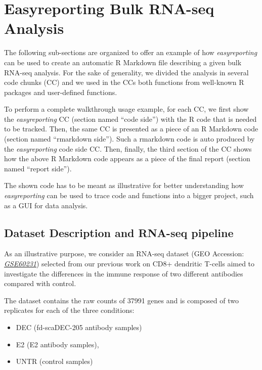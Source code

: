 \documentclass[]{article}
\begin{document}
\hypertarget{easyreporting-bulk-rna-seq-analysis}{%
\section{Easyreporting Bulk RNA-seq
Analysis}\label{easyreporting-bulk-rna-seq-analysis}}

The following sub-sections are organized to offer an example of how
\emph{easyreporting} can be used to create an automatic R Markdown file
describing a given bulk RNA-seq analysis. For the sake of generality, we
divided the analysis in several code chunks (CC) and we used in the CCs
both functions from well-known R packages and user-defined functions.

To perform a complete walkthrough usage example, for each CC, we first
show the \emph{easyreporting} CC (section named ``code side'') with the
R code that is needed to be tracked. Then, the same CC is presented as a
piece of an R Markdown code (section named ``rmarkdown side''). Such a
rmarkdown code is auto produced by the \emph{easyreporting} code side
CC. Then, finally, the third section of the CC shows how the above R
Markdown code appears as a piece of the final report (section named
``report side'').

The shown code has to be meant as illustrative for better understanding
how \emph{easyreporting} can be used to trace code and functions into a
bigger project, such as a GUI for data analysis.

\hypertarget{dataset-description-and-rna-seq-pipeline}{%
\subsection{Dataset Description and RNA-seq
pipeline}\label{dataset-description-and-rna-seq-pipeline}}

As an illustrative purpose, we consider an RNA-seq dataset (GEO
Accession:
\href{https://www.ncbi.nlm.nih.gov/geo/query/acc.cgi?acc=GSE60231}{\emph{GSE60231}})
selected from our previous work on CD8+ dendritic T-cells aimed to
investigate the differences in the immune response of two different
antibodies compared with control.

The dataset contains the raw counts of 37991 genes and is composed of
two replicates for each of the three conditions:

\begin{itemize}
\item
  DEC (fd-scaDEC-205 antibody samples)
\item
  E2 (E2 antibody samples),
\item
  UNTR (control samples)
\end{itemize}
\end{document}
